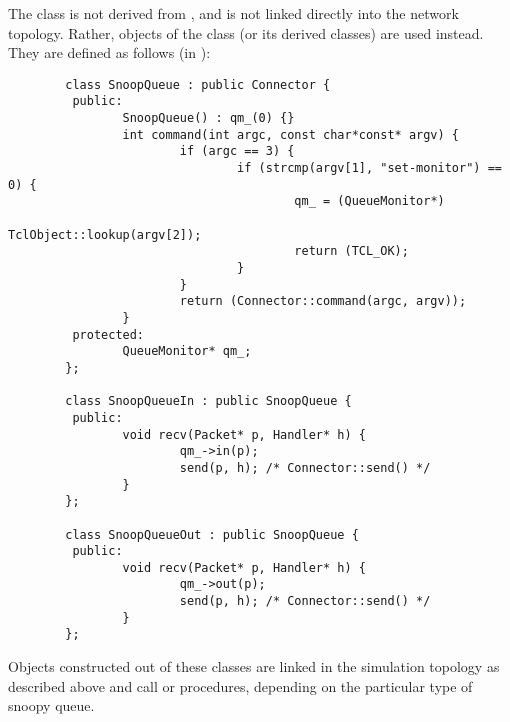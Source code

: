 The  class is not derived from , and
is not linked directly into the network topology.
Rather, objects of the  class (or its derived classes)
are used instead.
They are defined as follows (in ):
\begin{small}
\begin{verbatim}
        class SnoopQueue : public Connector {
         public:
                SnoopQueue() : qm_(0) {}
                int command(int argc, const char*const* argv) {
                        if (argc == 3) {
                                if (strcmp(argv[1], "set-monitor") == 0) {
                                        qm_ = (QueueMonitor*)
                                                TclObject::lookup(argv[2]);
                                        return (TCL_OK);
                                }
                        }
                        return (Connector::command(argc, argv));
                }
         protected:
                QueueMonitor* qm_;
        };

        class SnoopQueueIn : public SnoopQueue {
         public:
                void recv(Packet* p, Handler* h) {
                        qm_->in(p);
                        send(p, h); /* Connector::send() */
                }
        };

        class SnoopQueueOut : public SnoopQueue {
         public:
                void recv(Packet* p, Handler* h) {
                        qm_->out(p);
                        send(p, h); /* Connector::send() */
                }
        };
\end{verbatim}
\end{small}
Objects constructed out of these classes are linked in the simulation
topology as described above and call 
 or  procedures,
depending on the particular type of snoopy queue.

